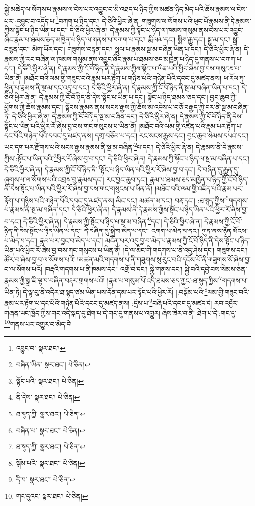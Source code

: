 སྐྱེ་མཆེད་ལ་སོགས་པ་རྣམས་ལ་ངེས་པར་འབྱུང་བ་མི་འཐད་པ་ཉིད་ཀྱིས་མཚན་ཉིད་མེད་པའི་ཆོས་རྣམས་ལ་ངེས་པར་:འབྱུང་བ་འདོད་པ་\footnote{འབྱུང་བ་  སྣར་ཐང་། }བཀག་པ་ཉིད་དང་། དེ་ཅིའི་ཕྱིར་ཞེ་ན། གཟུགས་ལ་སོགས་པའི་ཕུང་པོ་རྣམས་ནི་དེ་རྣམས་ཀྱིས་སྟོང་པ་ཉིད་ཡིན་པ་དང་། དེ་ཅིའི་ཕྱིར་ཞེ་ན། དེ་རྣམས་ཀྱི་སྟོང་པ་ཉིད་ལ་ཁམས་གསུམ་ནས་ངེས་པར་འབྱུང་ཞིང་རྣམ་པ་ཐམས་ཅད་མཁྱེན་པ་ཉིད་ལ་གནས་པ་བཀག་པ་དང་། རྨི་ལམ་དང་། སྨིག་རྒྱུ་དང་། སྒྱུ་མ་དང་། སྒྲ་བརྙན་དང་། མིག་ཡོར་དང་། གཟུགས་བརྙན་དང་། སྤྲུལ་པ་རྣམས་སྔ་མ་བཞིན་ཡིན་པ་དང་། དེ་ཅིའི་ཕྱིར་ཞེ་ན། དེ་རྣམས་ཀྱི་རང་བཞིན་ལ་ཁམས་གསུམ་ནས་འབྱུང་ཞིང་རྣམ་པ་ཐམས་ཅད་མཁྱེན་པ་ཉིད་དུ་གནས་པ་བཀག་པ་དང་། དེ་ཅིའི་ཕྱིར་ཞེ་ན། དེ་རྣམས་ཀྱི་ངོ་བོ་ཉིད་ནི་དེ་རྣམས་ཀྱིས་སྟོང་པ་ཡིན་པའི་ཕྱིར་ཞེས་བྱ་བས་གསུངས་པ་ཡིན་ནོ། །མཐོང་བའི་ལམ་གྱི་གཟུང་བའི་རྣམ་པར་རྟོག་པ་གཉིས་པའི་གཉེན་པོའི་དབང་དུ་མཛད་ནས། ཕ་རོལ་ཏུ་ཕྱིན་པ་རྣམས་ནི་སྔ་མ་དང་འདྲ་བ་དང་། དེ་ཅིའི་ཕྱིར་ཞེ་ན། དེ་རྣམས་ཀྱི་ངོ་བོ་ཉིད་ནི་སྔ་མ་བཞིན་ཡིན་པ་དང་། དེ་ཅིའི་ཕྱིར་ཞེ་ན། དེ་རྣམས་ཀྱི་ངོ་བོ་ཉིད་ནི་དེས་སྟོང་པ་ཡིན་པ་དང་། སྟོང་པ་ཉིད་ཐམས་ཅད་དང་། བྱང་ཆུབ་ཀྱི་ཕྱོགས་ཀྱི་ཆོས་རྣམས་དང་། སྟོབས་རྣམས་ནས་སངས་རྒྱས་ཀྱི་ཆོས་མ་འདྲེས་པ་བཅོ་བརྒྱད་ཀྱི་བར་ནི་སྔ་མ་བཞིན་ཏེ། དེ་ཅིའི་ཕྱིར་ཞེ་ན། དེ་རྣམས་ཀྱི་ངོ་བོ་ཉིད་སྔ་མ་བཞིན་དང་། དེ་ཅིའི་ཕྱིར་ཞེ་ན། དེ་རྣམས་ཀྱི་ངོ་བོ་ཉིད་ནི་དེས་སྟོང་པ་ཡིན་པའི་ཕྱིར་རོ་ཞེས་བྱ་བས་གང་གསུངས་པ་ཡིན་ནོ། །མཐོང་བའི་ལམ་གྱི་འཛིན་པའི་རྣམ་པར་རྟོག་པ་དང་པོའི་གཉེན་པོའི་དབང་དུ་མཛད་ནས། དགྲ་བཅོམ་པ་དང་། རང་སངས་རྒྱས་དང་། བྱང་ཆུབ་སེམས་དཔའ་དང་། ཡང་དག་པར་རྫོགས་པའི་སངས་རྒྱས་རྣམས་ནི་སྔ་མ་བཞིན་\footnote{བཞིན་ཡིན་  སྣར་ཐང་།  པེ་ཅིན། }པ་དང་། དེ་ཅིའི་ཕྱིར་ཞེ་ན། དེ་རྣམས་ནི་དེ་རྣམས་ཀྱིས་:སྟོང་པ་ཡིན་པའི་\footnote{སྟོང་པའི་  སྣར་ཐང་།  པེ་ཅིན། }ཕྱིར་རོ་ཞེས་བྱ་བ་དང་། དེ་ཅིའི་ཕྱིར་ཞེ་ན། དེ་རྣམས་ཀྱི་སྟོང་པ་ཉིད་ལ་སྔ་མ་བཞིན་པ་དང་། དེ་ཅིའི་ཕྱིར་ཞེ་ན། དེ་རྣམས་ཀྱི་ངོ་བོ་ཉིད་ནི་\footnote{ནི་དེས་  སྣར་ཐང་།  པེ་ཅིན། }སྟོང་པ་ཉིད་ཡིན་པའི་ཕྱིར་རོ་ཞེས་བྱ་བ་དང་། དེ་བཞིན་དུ་རྒྱུན་དུ་ཞུགས་པ་ལ་སོགས་པའི་འབྲས་བུ་རྣམས་དང་། རང་བྱང་ཆུབ་དང་། རྣམ་པ་ཐམས་ཅད་མཁྱེན་པ་ཉིད་ཀྱི་ངོ་བོ་ཉིད་ནི་དེས་སྟོང་པ་ཡིན་པའི་ཕྱིར་རོ་ཞེས་བྱ་བས་གང་གསུངས་པ་ཡིན་ནོ། །མཐོང་བའི་ལམ་གྱི་འཛིན་པའི་རྣམ་པར་རྟོག་པ་གཉིས་པའི་གཉེན་པོའི་དབང་དུ་མཛད་ནས། མིང་དང་། མཚན་མ་དང་། བརྡ་དང་། :ཐ་སྙད་ཀྱིས་\footnote{ཐ་སྙད་ཀྱི་  སྣར་ཐང་།  པེ་ཅིན། }གདགས་པ་རྣམས་ནི་སྔ་མ་བཞིན་དང་། དེ་ཅིའི་ཕྱིར་ཞེ་ན། དེ་རྣམས་ནི་དེ་རྣམས་ཀྱིས་སྟོང་པ་ཉིད་ཡིན་པའི་ཕྱིར་རོ་ཞེས་བྱ་བ་དང་། དེ་ཅིའི་ཕྱིར་ཞེ་ན། དེ་རྣམས་ཀྱི་སྟོང་པ་ཉིད་ལ་སྔ་མ་བཞིན་\footnote{བཞིན་པ་  སྣར་ཐང་།  པེ་ཅིན། }དང་། དེ་ཅིའི་ཕྱིར་ཞེ་ན། དེ་རྣམས་ཀྱི་ངོ་བོ་ཉིད་ནི་དེས་སྟོང་པ་ཉིད་ཡིན་པ་དང་། དེ་བཞིན་དུ་སྐྱེ་བ་མེད་པ་དང་། འགག་པ་མེད་པ་དང་། ཀུན་ནས་ཉོན་མོངས་པ་མེད་པ་དང་། རྣམ་པར་བྱང་བ་མེད་པ་དང་། མངོན་པར་འདུ་བྱ་བ་མེད་པ་རྣམས་ཀྱི་ངོ་བོ་ཉིད་ནི་དེས་སྟོང་པ་ཉིད་ཡིན་པའི་ཕྱིར་རོ་ཞེས་བྱ་བས་གང་གསུངས་པ་ཡིན་ནོ། །དེ་ལ་མིང་གི་གདགས་པ་ནི་འདུ་ཤེས་དང་། གཟུགས་དང་། ཚོར་བ་ཞེས་བྱ་བ་ལ་སོགས་པའོ། །མཚན་མའི་གདགས་པ་ནི་གཟུགས་སུ་རུང་བའི་དངོས་པོ་ནི་གཟུགས་སོ་ཞེས་བྱ་བ་ལ་སོགས་པའོ། །བརྡའི་གདགས་པ་ནི་ཁམས་དང་། འགྲོ་བ་དང་། སྐྱེ་གནས་དང་། སྐྱེ་བའི་དབྱེ་བས་སེམས་ཅན་རྣམས་ཀྱི་སྒྲ་ཇི་ལྟ་བ་བཞིན་བརྡར་གྲགས་པའོ། །རྣམ་པ་གསུམ་པོ་འདི་ཐམས་ཅད་ཀྱང་:ཐ་སྙད་ཀྱིས་\footnote{ཐ་སྙད་ཀྱི་  སྣར་ཐང་།  པེ་ཅིན། }གདགས་པ་ཡིན་ཏེ། དེ་ལྟ་བུ་ནི་འདིར་ཐ་སྙད་ཙམ་ཡིན་པས་དོན་དམ་པར་སྟོང་པའི་ཕྱིར་རོ། །:བསྒོམ་པའི་\footnote{སྒོམ་པའི་  སྣར་ཐང་།  པེ་ཅིན། }ལམ་གྱི་གཟུང་བའི་རྣམ་པར་རྟོག་པ་དང་པོའི་གཉེན་པོའི་དབང་དུ་མཛད་ནས། :དྲིས་པ་\footnote{དྲི་བ་  སྣར་ཐང་།  པེ་ཅིན། }བཞི་པའི་དབང་དུ་མཛད་དེ། རབ་འབྱོར་གཞན་ཡང་ཁྱོད་ཀྱིས་གང་འདི་སྐད་དུ་ཐེག་པ་དེ་གང་དུ་གནས་པ་འགྱུར། ཞེས་ཟེར་བ་ནི། ཐེག་པ་དེ་:གང་དུ་\footnote{གང་དུའང་  སྣར་ཐང་།  པེ་ཅིན། }གནས་པར་འགྱུར་བ་མེད་དེ། 